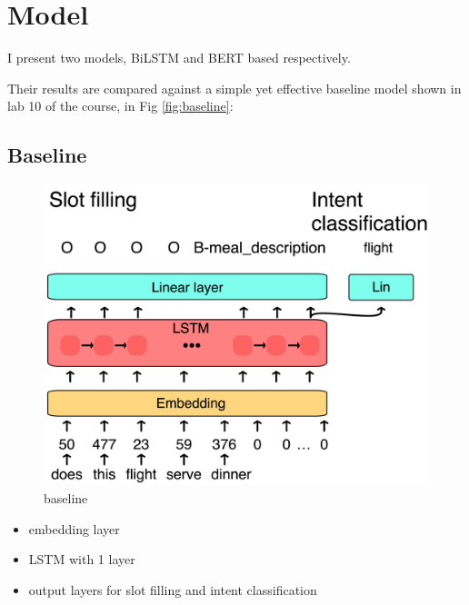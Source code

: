 \documentclass[a4paper]{article}
\begin{document}
\section{Model}

I present two models, BiLSTM and BERT based respectively. 

Their results are compared against a simple yet effective baseline model shown in lab 10 of the course, in Fig \ref{fig:baseline}:

\subsection{Baseline}
\begin{figure}[h!]
	\centering
	\includegraphics[width=0.8\linewidth]{../assets/images/baseline.png}
	\caption{baseline}
	\label{fig:Baseline}
\end{figure}
\begin{itemize}
	\item embedding layer
	\item LSTM with 1 layer
	\item output layers for slot filling and intent classification
\end{itemize}
\end{document}

